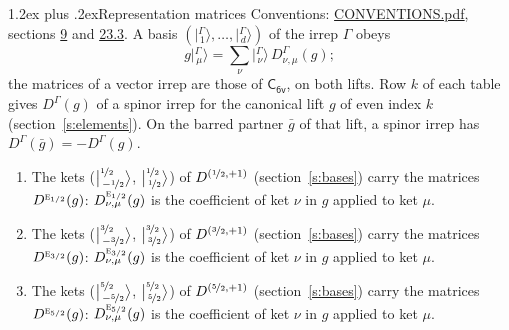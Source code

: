 \documentclass[10pt,a4paper]{article}
\makeatletter
\renewcommand\section{\@startsection{section}{1}{\z@}{-3ex plus -1ex minus -.2ex}%
  {1.2ex plus .2ex}{\normalfont\large\sffamily\bfseries\color{parttitle}}}
\numberwithin{equation}{section}
\newcommand{\grp}[1]{\mathsf{#1}}
\newcommand{\irr}[1]{\text{\normalfont\scshape #1}}
\newcommand{\irrJp}[2]{D^{(#1,#2)}}
\newcommand{\repD}[1]{D^{#1}}
\newcommand{\intx}{\mu}
\newcommand{\jm}[2]{\bigl\lvert{}^{#1}_{\,#2}\bigr\rangle}
\newcommand{\irket}[2]{\bigl\lvert{}^{#1}_{\,#2}\bigr\rangle}
\newcommand{\barred}[1]{\bar{#1}}
\newenvironment{romanlist}{\begin{enumerate}%
\renewcommand{\labelenumi}{(\roman{enumi})}}%
  {\end{enumerate}}
\makeatother
\begin{document}
\section{Representation matrices}\label{s:irrep_matrices}
Conventions: \href{../../CONVENTIONS.pdf}{CONVENTIONS.pdf}, sections \href{../../../rotation/CONVENTIONS.pdf\#conv.9}{9} and \href{../../CONVENTIONS.pdf\#conv.23.3}{23.3}.
\leavevmode\label{n:vector.ket.partner}\label{n:index.partner}\label{n:matrix.irrep}\label{n:index.partner.summed}A basis $(\irket{\Gamma}{1}, \dots, \irket{\Gamma}{d})$ of the irrep $\Gamma$ obeys
\begin{equation}\label{e:partner}g\irket{\Gamma}{\intx} = \sum_\nu \irket{\Gamma}{\nu}\, \repD{\Gamma}_{\nu,\intx}(g);\end{equation}
the matrices of a vector irrep are those of \href{../../../rotation/data/pdf/C6v.pdf}{$\grp{C_{6v}}$}, on both lifts. Row $k$ of each table gives $\repD{\Gamma}(g)$ of a spinor irrep for the canonical lift $g$ of even index $k$ (section~\ref{s:elements}). On the barred partner $\barred{g}$ of that lift, a spinor irrep has $\repD{\Gamma}(\barred{g}) = -\repD{\Gamma}(g)$.
\begin{romanlist}\raggedright
\item The kets ($\jm{\nicefrac{1}{2}}{-\nicefrac{1}{2}}$, $\jm{\nicefrac{1}{2}}{\nicefrac{1}{2}}$) of $\irrJp{\nicefrac{1}{2}}{+1}$ (section~\ref{s:bases}) carry the matrices $\repD{\irr{e}_{1/2}}(g)$: $\repD{\irr{e}_{1/2}}_{\nu,\intx}(g)$ is the coefficient of ket $\nu$ in $g$ applied to ket $\intx$.
\item The kets ($\jm{\nicefrac{3}{2}}{-\nicefrac{3}{2}}$, $\jm{\nicefrac{3}{2}}{\nicefrac{3}{2}}$) of $\irrJp{\nicefrac{3}{2}}{+1}$ (section~\ref{s:bases}) carry the matrices $\repD{\irr{e}_{3/2}}(g)$: $\repD{\irr{e}_{3/2}}_{\nu,\intx}(g)$ is the coefficient of ket $\nu$ in $g$ applied to ket $\intx$.
\item The kets ($\jm{\nicefrac{5}{2}}{-\nicefrac{5}{2}}$, $\jm{\nicefrac{5}{2}}{\nicefrac{5}{2}}$) of $\irrJp{\nicefrac{5}{2}}{+1}$ (section~\ref{s:bases}) carry the matrices $\repD{\irr{e}_{5/2}}(g)$: $\repD{\irr{e}_{5/2}}_{\nu,\intx}(g)$ is the coefficient of ket $\nu$ in $g$ applied to ket $\intx$.
\end{romanlist}
\end{document}
